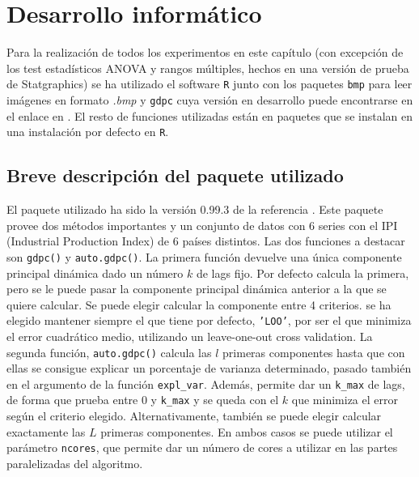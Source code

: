 %
%

\chapter{Desarrollo informático}
\label{ch:informatica}

Para la realización de todos los experimentos en este capítulo (con excepción de los test estadísticos ANOVA y rangos múltiples, hechos en una versión de prueba de Statgraphics) se ha utilizado el software \texttt{R} junto con los paquetes \texttt{bmp} para leer imágenes en formato \textit{.bmp} y \texttt{gdpc} cuya versión en desarrollo puede encontrarse en el enlace en \cite{ezeq}. El resto de funciones utilizadas están en paquetes que se instalan en una instalación por defecto en \texttt{R}.

\section{Breve descripción del paquete utilizado}

El paquete utilizado ha sido la versión 0.99.3 de la referencia \cite{ezeq}. Este paquete provee dos métodos importantes y un conjunto de datos con 6 series con el IPI (Industrial Production Index) de 6 países distintos. Las dos funciones a destacar son \texttt{gdpc()} y \texttt{auto.gdpc()}. La primera función devuelve una única componente principal dinámica dado un número $k$ de lags fijo. Por defecto calcula la primera, pero se le puede pasar la componente principal dinámica anterior a la que se quiere calcular. Se puede elegir calcular la componente entre 4 criterios. se ha elegido mantener siempre el que tiene por defecto, \texttt{'LOO'}, por ser el que minimiza el error cuadrático medio, utilizando un leave-one-out cross validation. La segunda función, \texttt{auto.gdpc()} calcula las $l$ primeras componentes hasta que con ellas se consigue explicar un porcentaje de varianza determinado, pasado también en el argumento de la función \texttt{expl\_var}. Además, permite dar un \texttt{k\_max} de lags, de forma que prueba entre 0 y \texttt{k\_max} y se queda con el $k$ que minimiza el error según el criterio elegido. Alternativamente, también se puede elegir calcular exactamente las $L$ primeras componentes. En ambos casos se puede utilizar el parámetro \texttt{ncores}, que permite dar un número de cores a utilizar en las partes paralelizadas del algoritmo.\\

